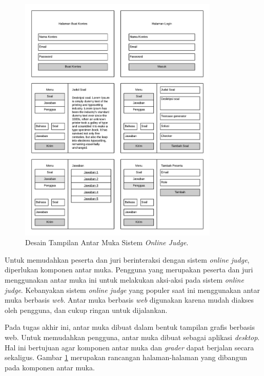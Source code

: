 \begin{figure}[ht!]
    \centering
    \includegraphics[width=0.85\textwidth]{images/mockup}
    \caption{Desain Tampilan Antar Muka Sistem \textit{Online Judge}.}
    \label{fig:mockup}
\end{figure}

\par Untuk memudahkan peserta dan juri berinteraksi dengan sistem \textit{online judge}, diperlukan komponen antar muka. Pengguna yang merupakan peserta dan juri menggunakan antar muka ini untuk melakukan aksi-aksi pada sistem \textit{online judge}. Kebanyakan sistem \textit{online judge} yang populer saat ini menggunakan antar muka berbasis \textit{web}. Antar muka berbasis \textit{web} digunakan karena mudah diakses oleh pengguna, dan cukup ringan untuk dijalankan.

\par Pada tugas akhir ini, antar muka dibuat dalam bentuk tampilan grafis berbasis web. Untuk memudahkan pengguna, antar muka dibuat sebagai aplikasi \textit{desktop}. Hal ini bertujuan agar komponen antar muka dan \textit{grader} dapat berjalan secara sekaligus. Gambar \ref{fig:mockup} merupakan rancangan halaman-halaman yang dibangun pada komponen antar muka.

